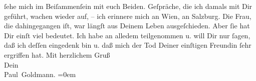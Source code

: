 \begin{ledgroupsized}[t]{13cm}
               ſehe mich im Beiſammenſein mit euch Beiden. Geſpräche, die ich damals mit Dir geführt, wachen
               wieder auf, – ich erinnere mich an Wien, an Salzburg.\pend
           \pstart
           Die Frau, die dahingegangen
               iſt, war längſt aus Deinem Leben ausgeſchieden. Aber ſie hat Dir einſt viel bedeutet.
                   Ich habe an alledem {\pb}teilgenommen u. will
               Dir nur ſagen, daß ich deſſen eingedenk bin u. daß mich der Tod Deiner einſtigen Freundin ſehr ergriffen
               hat.\pend
           \pstart
           Mit herzlichem Gruß {\\[\baselineskip]}Dein {\\[\baselineskip]}\spacefill\mbox{Paul Goldmann.}\pend
           \leftskip=0em{}
         
         \endnumbering{}\end{ledgroupsized}\begin{anhang}\end{anhang}\newcommand{\dateiname}{L03480}\newcommand{\titel}{Paul Goldmann an Arthur Schnitzler, 20. 11. 1925}\newcommand{\editorInnen}{Martin Anton Müller und Laura Untner}
      